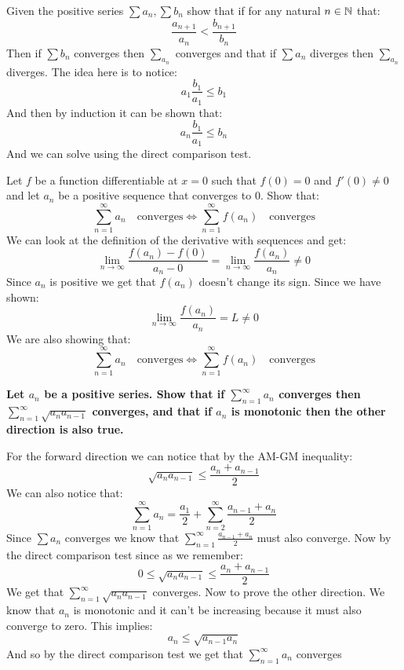 \documentclass[11pt,a4paper]{article}
\begin{document}
	Given the positive series $\sum{a_n},\sum{b_n}$ show that
	if for any natural $n\in\mathbb{N}$ that:
	\[
	\frac{a_{n+1}}{a_{n}} < \frac{b_{n+1}}{b_{n}}
	\]
	Then if $\sum{b_n}$ converges then $\sum_{a_n}$ converges and that if 
	$\sum{a_n}$ diverges then $\sum_{a_n}$ diverges.
	The idea here is to notice:
	\[
		a_1 \frac{b_1}{a_1} \le b_1
	\]
	And then by induction it can be shown that:
	\[
		a_n \frac{b_1}{a_1} \le b_n
	\]
	And we can solve using the direct comparison test.
	
	\newpage
	
	Let $f$ be a function differentiable at $x=0$ such that
	$f(0)=0$ and $f'(0)\neq 0$ and let $a_n$ be a positive sequence that
	converges to $0$. Show that:
	\[
	\sum_{n=1}^{\infty}{a_n} \quad\text{converges} \iff 
	\sum_{n=1}^{\infty}{f(a_n)} \quad\text{converges}
	\]
	We can look at the definition of the derivative with sequences and get:
	\[
		\lim_{n\to\infty}{\frac{f(a_n)-f(0)}{a_n-0}} = 
		\lim_{n\to\infty}{\frac{f(a_n)}{a_n}} \neq 0
	\]
	Since $a_n$ is positive we get that $f(a_n)$ doesn't change its sign.
	Since we have shown:
	\[
		\lim_{n\to\infty}{\frac{f(a_n)}{a_n}} = L \neq 0
	\]
	We are also showing that:
	\[
	\sum_{n=1}^{\infty}{a_n} \quad\text{converges} \iff 
	\sum_{n=1}^{\infty}{f(a_n)} \quad\text{converges}
	\]
	
	\newpage
	
	\textbf{Let $a_n$ be a positive series. Show that if 
	$\sum_{n=1}^{\infty}{a_n}$ converges then 
	$\sum_{n=1}^{\infty}{\sqrt{a_{n}a_{n-1}}}$ converges, and that if
	$a_n$ is monotonic then the other direction is also true.}
	
	For the forward direction we can notice that by the AM-GM inequality:
	\[
		 \sqrt{a_{n}a_{n-1}} \le \frac{a_{n}+a_{n-1}}{2}
	\]
	We can also notice that:
	\[
		\sum_{n=1}^{\infty}{a_n} = 
		\frac{a_1}{2} + \sum_{n=2}^{\infty}{\frac{a_{n-1}+a_n}{2}}
	\]
	Since $\sum{a_n}$ converges we know that 
	$\sum_{n=1}^{\infty}{\frac{a_{n-1}+a_n}{2}}$ must also converge. Now by
	the direct comparison test since as we remember:
	\[
		 0 \le \sqrt{a_{n}a_{n-1}} \le \frac{a_{n}+a_{n-1}}{2}
	\]
	We get that $\sum_{n=1}^{\infty}{\sqrt{a_{n}a_{n-1}}}$ converges.
	Now to prove the other direction. We know that $a_n$ is monotonic
	and it can't be increasing because it must also converge to zero.
	This implies:
	\[
		a_n \le \sqrt{a_{n-1}a_n}
	\]
	And so by the direct comparison test we get that 
	$\sum_{n=1}^{\infty}{a_n}$ converges
	
	\newpage
\end{document}
